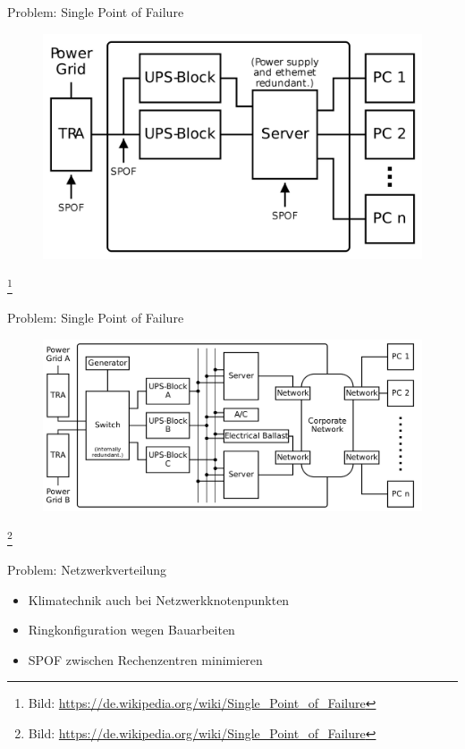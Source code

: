 \documentclass[10pt]{beamer}
\newcommand\blfootnote[1]{%
	\begingroup
	\renewcommand\thefootnote{}\footnote{#1}%
	\addtocounter{footnote}{-1}%
	\endgroup
}
\begin{document}
\begin{frame}[fragile]{Problem: Single Point of Failure}
\begin{figure}
	\includegraphics[width=1\textwidth]{images/spof2}
\end{figure}
\blfootnote{Bild: \href{https://de.wikipedia.org/wiki/Single_Point_of_Failure}{https://de.wikipedia.org/wiki/Single\_Point\_of\_Failure}}
\end{frame}

\begin{frame}[fragile]{Problem: Single Point of Failure}
\begin{figure}
	\includegraphics[width=1\textwidth]{images/spof3}
\end{figure}
\blfootnote{Bild: \href{https://de.wikipedia.org/wiki/Single_Point_of_Failure}{https://de.wikipedia.org/wiki/Single\_Point\_of\_Failure}}
\end{frame}

%
%
\begin{frame}[fragile]{Problem: Netzwerkverteilung}
	\begin{itemize}
	\item Klimatechnik auch bei Netzwerkknotenpunkten
	\item Ringkonfiguration wegen Bauarbeiten
	\item SPOF zwischen Rechenzentren minimieren
\end{itemize}
\end{frame}
\end{document}
